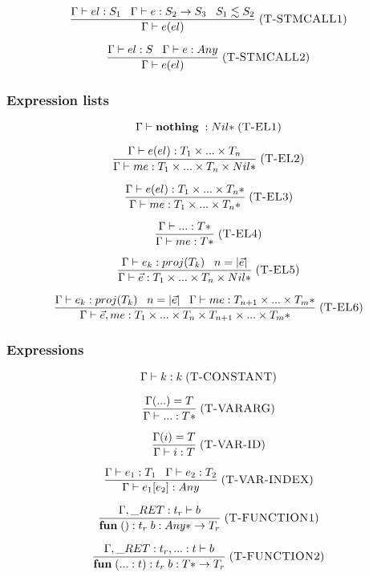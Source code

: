 \documentclass[12pt]{article}
\newcommand{\mylabel}[1]{\; (\textsc{#1})}
\newcommand{\kw}[1]{\mathbf{#1} \;}
\newcommand{\env}{\Gamma}
\newcommand{\ret}{\string_RET}
\begin{document}
\[
\frac{\env \vdash el:S_{1} \;\;\;
      \env \vdash e:S_{2} \rightarrow S_{3} \;\;\;
      S_{1} \lesssim S_{2}}
     {\env \vdash e(el)}
\mylabel{T-STMCALL1}
\]

\[
\frac{\env \vdash el:S \;\;\;
      \env \vdash e:Any}
     {\env \vdash e(el)}
\mylabel{T-STMCALL2}
\]

\subsubsection{Expression lists}

\[
\env \vdash \kw{nothing}:{Nil*}
\mylabel{T-EL1}
\]

\[
\frac{\env \vdash e(el):T_{1} \times ... \times T_{n}}
     {\env \vdash me:T_{1} \times ... \times T_{n} \times {Nil*}}
\mylabel{T-EL2}
\]

\[
\frac{\env \vdash e(el):T_{1} \times ... \times {T_{n}*}}
     {\env \vdash me:T_{1} \times ... \times {T_{n}*}}
\mylabel{T-EL3}
\]

\[
\frac{\env \vdash {...}:{T*}}
     {\env \vdash me:{T*}}
\mylabel{T-EL4}
\]

\[
\frac{\env \vdash e_{k}:proj(T_{k}) \;\;\;
      n = |\vec{e}|}
     {\env \vdash \vec{e}:T_{1} \times ... \times T_{n} \times {Nil*}}
\mylabel{T-EL5}
\]

\[
\frac{\env \vdash e_{k}:proj(T_{k}) \;\;\;
      n = |\vec{e}|\;\;\;
      \env \vdash me:T_{n+1} \times ... \times {T_{m}*}}
     {\env \vdash \vec{e},me:T_{1} \times ... \times T_{n} \times T_{n+1} \times ... \times {T_{m}*}}
\mylabel{T-EL6}
\]

\subsubsection{Expressions}

\[
\env \vdash k : k
\mylabel{T-CONSTANT}
\]

\[
\frac{\env({...}) = T}
     {\env \vdash {...} : {T*}}
\mylabel{T-VARARG}
\]

\[
\frac{\env(i) = T}
     {\env \vdash i : T}
\mylabel{T-VAR-ID}
\]

\[
\frac{\env \vdash e_{1}:T_{1} \;\;\;
      \env \vdash e_{2}:T_{2}}
     {\env \vdash e_{1}[e_{2}] : Any}
\mylabel{T-VAR-INDEX}
\]

\[
\frac{\env, \ret:t_{r} \vdash b}
     {\kw{fun} ():t_{r} \; b : {Any*} \rightarrow T_{r}}
\mylabel{T-FUNCTION1}
\]

\[
\frac{\env, \ret:t_{r}, {...}:t \vdash b}
     {\kw{fun} ({...}:t):t_{r} \; b : {T*} \rightarrow T_{r}}
\mylabel{T-FUNCTION2}
\]
\end{document}
